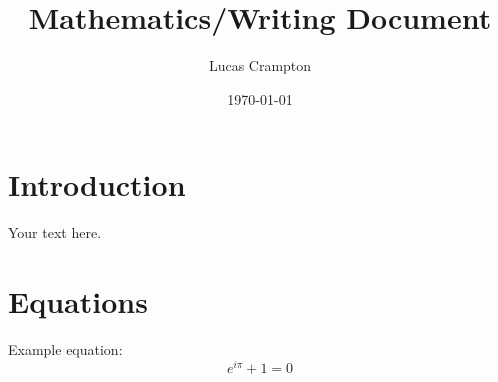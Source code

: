 \documentclass[12pt]{article}
\title{Mathematics/Writing Document}
\author{Lucas Crampton}
\date{\today}
\begin{document}
\maketitle

\section{Introduction}
Your text here.

\section{Equations}
Example equation:
\begin{equation}
    e^{i\pi} + 1 = 0
\end{equation}
\end{document}
